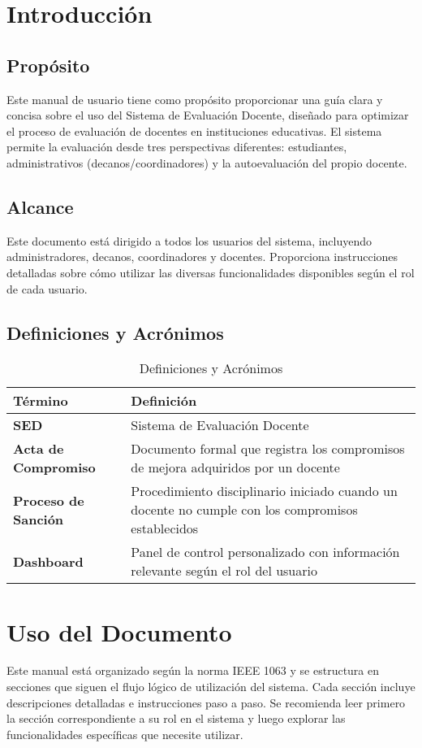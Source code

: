 \documentclass[12pt,a4paper]{article}
\begin{document}
\section{Introducción}\label{sec:introduccion}
\subsection{Propósito}
Este manual de usuario tiene como propósito proporcionar una guía clara y concisa sobre el uso del Sistema de Evaluación Docente, diseñado para optimizar el proceso de evaluación de docentes en instituciones educativas. El sistema permite la evaluación desde tres perspectivas diferentes: estudiantes, administrativos (decanos/coordinadores) y la autoevaluación del propio docente.

\subsection{Alcance}
Este documento está dirigido a todos los usuarios del sistema, incluyendo administradores, decanos, coordinadores y docentes. Proporciona instrucciones detalladas sobre cómo utilizar las diversas funcionalidades disponibles según el rol de cada usuario.

\subsection{Definiciones y Acrónimos}
\begin{table}[H]
  \centering
  \caption{Definiciones y Acrónimos}\label{tab:acronimos}
  \begin{tabularx}{\textwidth}{>{\bfseries}lX}
    \toprule
    Término & Definición \\
    \midrule
    SED & Sistema de Evaluación Docente \\
    Acta de Compromiso & Documento formal que registra los compromisos de mejora adquiridos por un docente \\
    Proceso de Sanción & Procedimiento disciplinario iniciado cuando un docente no cumple con los compromisos establecidos \\
    Dashboard & Panel de control personalizado con información relevante según el rol del usuario \\
    \bottomrule
  \end{tabularx}
\end{table}

\section{Uso del Documento}\label{sec:uso-documento}
Este manual está organizado según la norma IEEE 1063 y se estructura en secciones que siguen el flujo lógico de utilización del sistema. Cada sección incluye descripciones detalladas e instrucciones paso a paso. Se recomienda leer primero la sección correspondiente a su rol en el sistema y luego explorar las funcionalidades específicas que necesite utilizar.
\end{document}
